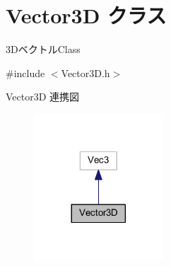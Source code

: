 \hypertarget{class_vector3_d}{}\section{Vector3D クラス}
\label{class_vector3_d}


3\+Dベクトル\+Class  




{\ttfamily \#include $<$Vector3\+D.\+h$>$}



Vector3D 連携図\nopagebreak
\begin{figure}[H]
\begin{center}
\leavevmode
\includegraphics[width=137pt]{class_vector3_d__coll__graph}
\end{center}
\end{figure}
